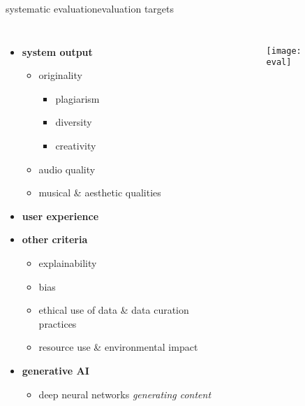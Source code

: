 \begin{frame}{systematic evaluation}{evaluation targets}
    \vspace{-7mm}
    \begin{columns}
        \begin{itemize}
            \item \textbf{system output}
                \begin{itemize}
                    \item   originality
                        \begin{itemize}
                            \item plagiarism
                            \item   diversity
                            \item creativity
                        \end{itemize}
                    \item   audio quality
                    \item   musical \& aesthetic qualities
                \end{itemize}
            \bigskip
            \item \textbf{user experience}
            \bigskip
            \item   \textbf{other criteria}
                \begin{itemize}
                    \item explainability
                    \item bias
                    \item   ethical use of data \& data curation practices
                    \item   resource use \& environmental impact
                \end{itemize}
            \bigskip
            \item   \textbf{generative AI}
                \begin{itemize}
                    \item deep neural networks \textit{generating content}
                \end{itemize}
        \end{itemize}
        \begin{figure}%
            \texttt{[image: eval]}%
        \end{figure}
    \end{columns}
\end{frame}

